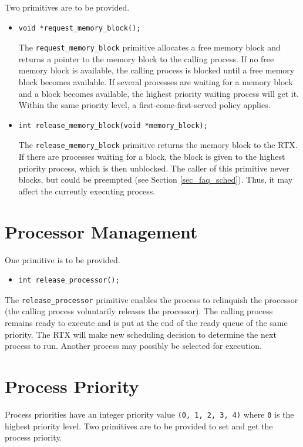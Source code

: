 Two primitives are to be provided. \\ 
  \begin{itemize}
    \item[]{}
\begin{lstlisting}
void *request_memory_block();
\end{lstlisting}
    The \verb+request_memory_block+ primitive allocates a free memory block and returns a pointer to the memory block to the calling process. If no free memory block is available, the calling process is blocked until a free memory block becomes available. If several processes are waiting for a memory block and a block becomes available, the highest priority waiting process will get it. Within the same priority level, a first-come-first-served policy applies.\\ 
    \item[]{}
\begin{lstlisting}
int release_memory_block(void *memory_block);
\end{lstlisting}
      The \verb+release_memory_block+ primitive returns the memory block to the RTX. If there are processes waiting for a block, the block is given to the highest priority process, which is then unblocked. The caller of this primitive never blocks, but could be preempted (see Section \ref{sec_faq_sched}). Thus, it may affect the currently executing process.
\end{itemize}

\section{Processor Management}
\label{sec_processor}
One primitive is to be provided. \\
  \begin{itemize}[]
    \item[]{}
\begin{lstlisting}
int release_processor();
\end{lstlisting}
  \end{itemize} 
The \verb+release_processor+ primitive enables the process to relinquish the processor (the calling process voluntarily releases the processor). The calling process remains ready to execute and is put at the end of the ready queue of the same priority. The RTX will make new scheduling decision to determine the next process to run. Another process may possibly be selected for execution.

\section{Process Priority}
\label{sec_priority}
Process priorities have an integer priority value \verb+(0, 1, 2, 3, 4)+ where \verb+0+ is the highest priority level. Two primitives are to be provided to set and get the process priority. \\

